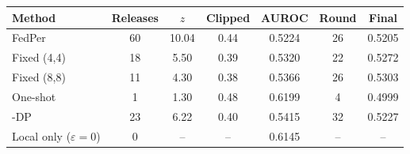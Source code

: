 \begin{tabular}{@{}lcccccc@{}}
\toprule
Method & Releases & $z$ & Clipped & AUROC & Round & Final\\
\midrule
FedPer & 60 & 10.04 & 0.44 & 0.5224 & 26 & 0.5205\\
Fixed (4,4) & 18 & 5.50 & 0.39 & 0.5320 & 22 & 0.5272\\
Fixed (8,8) & 11 & 4.30 & 0.38 & 0.5366 & 26 & 0.5303\\
One-shot & 1 & 1.30 & 0.48 & 0.6199 & 4 & 0.4999\\
\tierfed{}-DP & 23 & 6.22 & 0.40 & 0.5415 & 32 & 0.5227\\
\midrule
Local only ($\varepsilon=0$) & 0 & -- & -- & 0.6145 & -- & --\\
\bottomrule
\end{tabular}
